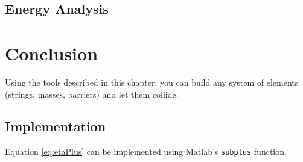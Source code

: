 \documentclass{article}
\begin{document}
\subsection{Energy Analysis}

\section{Conclusion}
Using the tools described in this chapter, you can build any system of elements (strings, masses, barriers) and let them collide.
\subsection{Implementation}
Equation \eqref{eq:etaPlus} can be implemented using Matlab's \texttt{subplus} function.



\appendix
\end{document}
